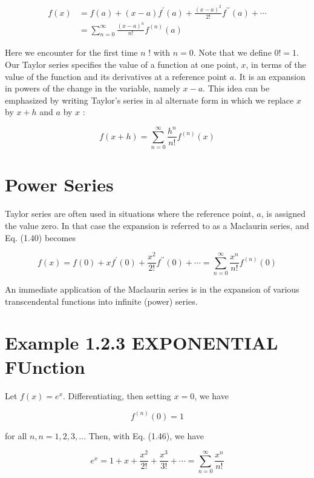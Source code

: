 \documentclass[10pt]{article}
\begin{document}
\begin{align*}
f(x) & =f(a)+(x-a) f^{\prime}(a)+\frac{(x-a)^{2}}{2!} f^{\prime \prime}(a)+\cdots \\
& =\sum_{n=0}^{\infty} \frac{(x-a)^{n}}{n!} f^{(n)}(a) \tag{1.44}
\end{align*}


Here we encounter for the first time $n$ ! with $n=0$. Note that we define $0!=1$.\\
Our Taylor series specifies the value of a function at one point, $x$, in terms of the value of the function and its derivatives at a reference point $a$. It is an expansion in powers of the change in the variable, namely $x-a$. This idea can be emphasized by writing Taylor's series in al alternate form in which we replace $x$ by $x+h$ and $a$ by $x$ :


\begin{equation*}
f(x+h)=\sum_{n=0}^{\infty} \frac{h^{n}}{n!} f^{(n)}(x) \tag{1.45}
\end{equation*}


\section*{Power Series}
Taylor series are often used in situations where the reference point, $a$, is assigned the value zero. In that case the expansion is referred to as a Maclaurin series, and Eq. (1.40) becomes


\begin{equation*}
f(x)=f(0)+x f^{\prime}(0)+\frac{x^{2}}{2!} f^{\prime \prime}(0)+\cdots=\sum_{n=0}^{\infty} \frac{x^{n}}{n!} f^{(n)}(0) \tag{1.46}
\end{equation*}


An immediate application of the Maclaurin series is in the expansion of various transcendental functions into infinite (power) series.

\section*{Example 1.2.3 EXPONENTIAL FUnction}
Let $f(x)=e^{x}$. Differentiating, then setting $x=0$, we have

$$
f^{(n)}(0)=1
$$

for all $n, n=1,2,3, \ldots$ Then, with Eq. (1.46), we have


\begin{equation*}
e^{x}=1+x+\frac{x^{2}}{2!}+\frac{x^{3}}{3!}+\cdots=\sum_{n=0}^{\infty} \frac{x^{n}}{n!} \tag{1.47}
\end{equation*}
\end{document}
